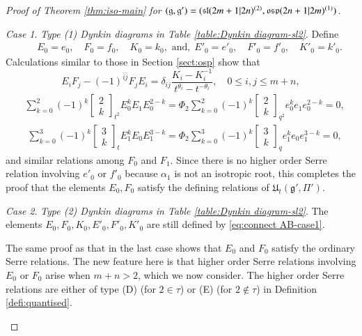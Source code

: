 \documentclass[12pt]{amsart}
\theoremstyle{definition}
\theoremstyle{remark}
\numberwithin{equation}{section}
\newtheorem{case}{Case}
\begin{document}
\begin{proof}[Proof of Theorem \ref{thm:iso-main} for $({{\mathfrak g}}, {{\mathfrak g}}')=({{\rm\mathfrak{sl}}}(2m+1|2n)^{(2)}, {{\rm\mathfrak{osp}}}(2n+1|2m)^{(1)})$]
\begin{case}
{\em Type (1) Dynkin diagrams  in Table \ref{table:Dynkin diagram-sl2}}.
Define 
\begin{equation}\label{eq:connect AB-case1}
\begin{aligned}
&\quad E_0=e_0,\quad F_0=f_0, \quad K_0=k_0, \text{ and,}\ \ E'_0=e'_0,\quad F'_0=f'_0, \quad K'_0=k'_0.
\end{aligned}
\end{equation}
Calculations similar to those in Section \ref{sect:osp} show that 
\begin{equation*}
E_i F_j - (-1)^{\bar{i}\bar{j}}F_j E_i
    =\delta_{i j} \frac{K_i -K_i^{-1}}{t ^{\theta_i}- t^{-\theta_i}}, \quad 0\le i, j\le m+n,
\end{equation*}
\[
\begin{aligned}
&\sum_{k=0}^2(-1)^k\begin{bmatrix} 2\\ k \end{bmatrix}_{t^2}E_0^kE_1E_0^{2-k}
=\Phi_2\sum_{k=0}^2(-1)^k\begin{bmatrix}2\\k\end{bmatrix}_{q^2}e_0^ke_1e_0^{2-k}=0,
\end{aligned}\]
\[\begin{aligned}
&\sum_{k=0}^3(-1)^k\begin{bmatrix} 3\\ k \end{bmatrix}_{t}E_1^kE_0E_1^{3-k}=\Phi_2 \sum_{k=0}^3(-1)^k\begin{bmatrix}3\\k\end{bmatrix}_{q}e_1^ke_0e_1^{3-k}=0,
\end{aligned}
\]
and similar relations among $F_0$ and $F_1$. 
Since there is no higher order Serre relation involving $e'_0$ or $f'_0$ because
 $\alpha_1$ is not an isotropic root,
this completes the proof that the elements
$E_0, F_0$ satisfy the defining relations of ${{\mathfrak U}}_t({{\mathfrak g}}', \Pi')$.
\end{case}

\begin{case}
{\em Type (2) Dynkin diagrams  in Table \ref{table:Dynkin diagram-sl2}}.
The elements $E_0, F_0, K_0, E'_0, F'_0, K'_0$ are still defined by \eqref{eq:connect AB-case1}.

The same proof as that in the last case shows that $E_0$ and $F_0$  satisfy the ordinary Serre relations. The new feature here is that higher order Serre relations involving $E_0$ or $F_0$ arise when $m+n>2$, which we now consider.
The higher order Serre relations are either of type (D) (for $2\in\tau$) or (E) (for $2\notin\tau$)  in Definition \ref{defi:quantised}.


\end{case}
\end{proof}
\end{document}
